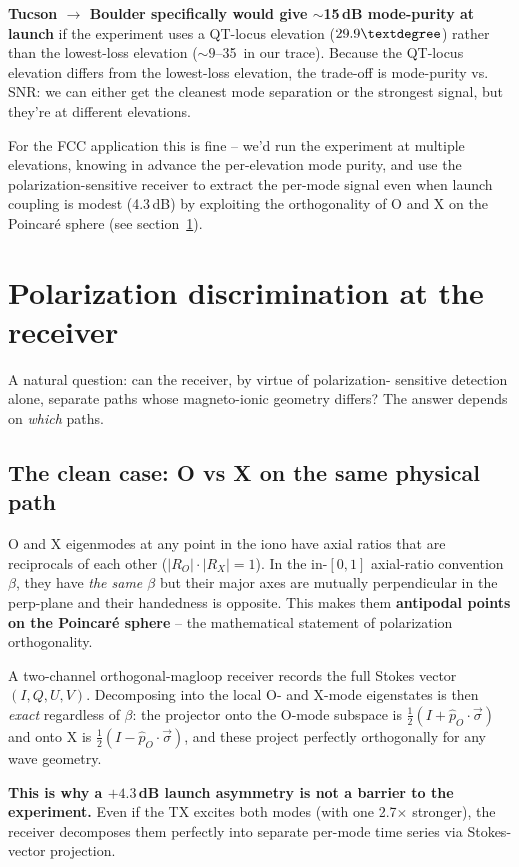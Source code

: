 \documentclass[11pt]{article}
\begin{document}
\textbf{Tucson $\to$ Boulder specifically would give $\sim$15\,dB
mode-purity at launch} if the experiment uses a QT-locus elevation
($29.9\textdegree$) rather than the lowest-loss elevation
($\sim 9$--35\textdegree\ in our trace).  Because the QT-locus
elevation differs from the lowest-loss elevation, the trade-off is
mode-purity vs. SNR: we can either get the cleanest mode separation
or the strongest signal, but they're at different elevations.

For the FCC application this is fine -- we'd run the experiment at
multiple elevations, knowing in advance the per-elevation mode
purity, and use the polarization-sensitive receiver to extract the
per-mode signal even when launch coupling is modest (4.3\,dB) by
exploiting the orthogonality of O and X on the Poincar\'e sphere
(see section~\ref{sec:pol-discrim}).


\section{Polarization discrimination at the receiver}
\label{sec:pol-discrim}

A natural question: can the receiver, by virtue of polarization-
sensitive detection alone, separate paths whose magneto-ionic
geometry differs?  The answer depends on \emph{which} paths.

\subsection*{The clean case: O vs X on the same physical path}

O and X eigenmodes at any point in the iono have axial ratios that
are reciprocals of each other ($|R_O|\cdot|R_X|=1$).  In the
in-$[0,1]$ axial-ratio convention $\beta$, they have \emph{the same
$\beta$} but their major axes are mutually perpendicular in the
perp-plane and their handedness is opposite.  This makes them
\textbf{antipodal points on the Poincar\'e sphere} -- the
mathematical statement of polarization orthogonality.

A two-channel orthogonal-magloop receiver records the full Stokes
vector $(I,Q,U,V)$.  Decomposing into the local O- and X-mode
eigenstates is then \emph{exact} regardless of $\beta$: the
projector onto the O-mode subspace is $\tfrac{1}{2}(I+\hat{p}_O\cdot\vec\sigma)$
and onto X is $\tfrac{1}{2}(I-\hat{p}_O\cdot\vec\sigma)$, and these
project perfectly orthogonally for any wave geometry.

\textbf{This is why a $+4.3$\,dB launch asymmetry is not a barrier
to the experiment.}  Even if the TX excites both modes (with one
2.7$\times$ stronger), the receiver decomposes them perfectly into
separate per-mode time series via Stokes-vector projection.
\end{document}
